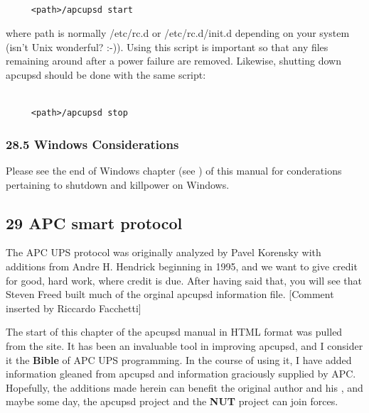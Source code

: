 \footnotesize
\begin{verbatim}
     
     <path>/apcupsd start
\end{verbatim}
\normalsize

where \lt{}path\gt{} is normally /etc/rc.d or /etc/rc.d/init.d depending on
your system (isn't Unix wonderful? :-)). Using this script is important so
that any files remaining around after a power failure are removed. Likewise,
shutting down apcupsd should be done with the same script: 

\footnotesize
\begin{verbatim}
     
     <path>/apcupsd stop
\end{verbatim}
\normalsize

\label{Windows-Considerations}

\subsubsection*{28.5 Windows Considerations}

\label{index-Windows-Considerations-261}
Please see the end of Windows chapter (see 
) of this
manual for conderations pertaining to shutdown and killpower on Windows. 

\label{APC-smart-protocol}

\subsection*{29 APC smart protocol}

\label{index-Smart-protocol-262}
\label{index-Protocol-Smart-263}
The APC UPS protocol was originally analyzed by Pavel Korensky with additions
from Andre H. Hendrick beginning in 1995, and we want to give credit for good,
hard work, where credit is due. After having said that, you will see that
Steven Freed built much of the orginal apcupsd information file. [Comment
inserted by Riccardo Facchetti]  

The start of this chapter of the apcupsd manual in HTML format was pulled from
the 
 site. It has been an
invaluable tool in improving apcupsd, and I consider it the {\bf Bible} of APC
UPS programming. In the course of using it, I have added information gleaned
from apcupsd and information graciously supplied by APC. Hopefully, the
additions made herein can benefit the original author and his 
, and maybe some day,
the apcupsd project and the {\bf NUT} project can join forces. 

